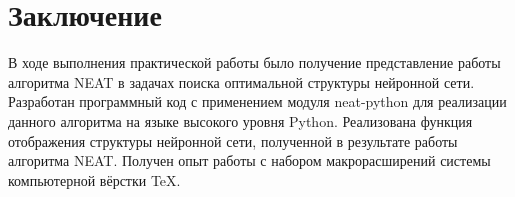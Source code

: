 \documentclass{article}
\begin{document}
\section*{Заключение}
В ходе выполнения практической работы было получение представление работы алгоритма NEAT в задачах поиска оптимальной структуры нейронной сети. Разработан программный код с применением модуля neat-python для реализации данного алгоритма на языке высокого уровня Python. Реализована функция отображения структуры нейронной сети, полученной в результате работы алгоритма NEAT. Получен опыт работы с набором макрорасширений системы компьютерной вёрстки TeX.



\end{document}
